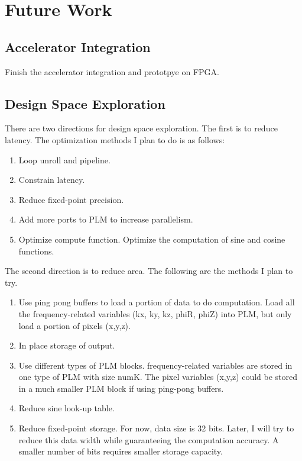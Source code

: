 \documentclass{sig-alternate}
\begin{document}
\section{Future Work}

\subsection{Accelerator Integration}
Finish the accelerator integration and prototpye on FPGA.

\subsection{Design Space Exploration}
There are two directions for design space exploration. The first is to reduce latency. The optimization methods I plan to do is as follows:
\begin{enumerate}
\setlength\itemsep{-0.15em}
\item Loop unroll and pipeline.
\item Constrain latency.
\item Reduce fixed-point precision.
\item Add more ports to PLM to increase parallelism.
\item Optimize compute function. Optimize the computation of sine and cosine functions.
\end{enumerate}
The second direction is to reduce area. The following are the methods I plan to try.
\begin{enumerate}
\setlength\itemsep{-0.15em}
    \item Use ping pong buffers to load a portion of data to do computation. Load all the frequency-related variables (kx, ky, kz, phiR, phiZ) into PLM, but only load a portion of pixels (x,y,z). 
    \item In place storage of output. 
    \item Use different types of PLM blocks. frequency-related variables are stored in one type of PLM with size numK. The pixel variables (x,y,z) could be stored in a much smaller PLM block if using ping-pong buffers. 
    \item Reduce sine look-up table.  
    \item Reduce fixed-point storage. For now, data size is 32 bits. Later, I will try to reduce this data width while guaranteeing the computation accuracy. A smaller number of bits requires smaller storage capacity.
\end{enumerate}
\end{document}
